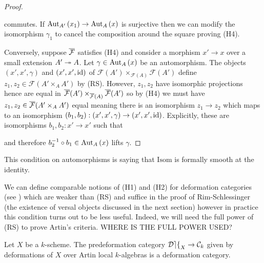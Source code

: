 \documentclass[12pt]{article}
\newcommand{\cDef}{\mathcal{Def}}
\renewcommand{\F}{\mathcal{F}}
\begin{document}
\begin{proof}
\begin{center}
\end{center}
commutes. If $\Aut[A']{x_1} \to \Aut[A]{x}$ is surjective then we can modify the isomorphism $\gamma_1$ to cancel the composition around the square proving (H4).
\par
Conversely, suppose $\ol{\F}$ satisfies (H4) and consider a morphism $x' \to x$ over a small extension $A' \onto A$. Let $\gamma \in \Aut[A]{x}$ be an automorphism. The objects $(x', x', \gamma)$ and $(x', x', \id)$ of $\F(A') \times_{\F(A)} \F(A')$ define $z_1, z_2 \in \F(A' \times_A A')$ by (RS). However, $z_1, z_2$ have isomorphic projections hence are equal in $\ol{\F}(A') \times_{\ol{\F}(A)} \ol{\F}(A')$ so by (H4) we must have $z_1, z_2 \in \ol{\F}(A' \times_A A')$ equal meaning there is an isomorphism $z_1 \to z_2$ which maps to an isomorphism $(b_1, b_2) : (x', x', \gamma) \to (x', x', \id)$. Explicitly, these are isomorphisms $b_1, b_2 : x' \to x'$ such that
\begin{center}
\end{center}
and therefore $b_2^{-1} \circ b_1 \in \Aut[A]{x}$ lifts $\gamma$.
\end{proof}

\begin{rmk}
This condition on automorphisms is saying that $\mathrm{Isom}$ is formally smooth at the identity. 
\end{rmk}

\begin{rmk}
We can define comparable notions of (H1) and (H2) for deformation categories (see ) which are weaker than (RS) and suffice in the proof of Rim-Schlessinger (the existence of versal objects discussed in the next section) however in practice this condition turns out to be less useful. Indeed, we will need the full power of (RS) to prove Artin's criteria. {\color{red} WHERE IS THE FULL POWER USED?}
\end{rmk}

\begin{prop}
Let $X$ be a $k$-scheme. The predeformation category $\cDef_X \to \C_k$ given by deformations of $X$ over Artin local $k$-algebras is a deformation category.
\end{prop}
\end{document}
